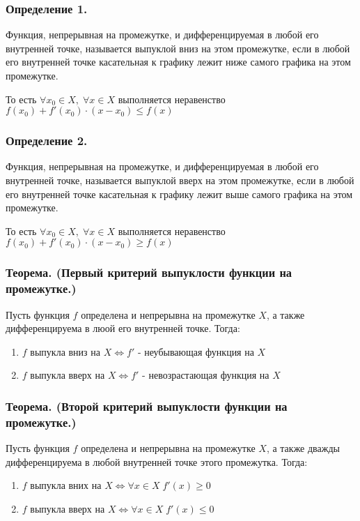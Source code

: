 \documentclass[a4paper,12pt]{article}
\theoremstyle{plain} %
\theoremstyle{definition} %
\theoremstyle{remark} %
\begin{document}
\subsubsection*{Определение 1.}
Функция, непрерывная на промежутке, и дифференцируемая в любой его внутренней точке, называется выпуклой вниз на этом промежутке, если в любой его внутренней точке касательная к графику лежит ниже самого графика на этом промежутке.

То есть $\forall x_0 \in X, \; \forall x \in X$ выполняется неравенство $f(x_0) + f'(x_0) \cdot (x - x_0) \leq f(x)$

\subsubsection*{Определение 2.}
Функция, непрерывная на промежутке, и дифференцируемая в любой его внутренней точке, называется выпуклой вверх на этом промежутке, если в любой его внутренней точке касательная к графику лежит выше самого графика на этом промежутке.

То есть $\forall x_0 \in X, \; \forall x \in X$ выполняется неравенство $f(x_0) + f'(x_0) \cdot (x - x_0) \geq f(x)$

\subsubsection*{Теорема. (Первый критерий выпуклости функции на промежутке.)}
Пусть функция $f$ определена и непрерывна на промежутке $X$, а также дифференцируема в люой его внутренней точке. Тогда:

\begin{enumerate}
	\item $f$ выпукла вниз на $X \Leftrightarrow f'$ - неубывающая функция на $X$
	\item $f$ выпукла вверх на $X \Leftrightarrow f'$ - невозрастающая функция на $X$
\end{enumerate}

\subsubsection*{Теорема. (Второй критерий выпуклости функции на промежутке.)}
Пусть функция $f$ определена и непрерывна на промежутке $X$, а также дважды дифференцируема в любой внутренней точке этого промежутка.
Тогда:

\begin{enumerate}
	\item $f$ выпукла вних на $X \Leftrightarrow \forall x \in X \;  f'(x) \geq 0$
	\item $f$ выпукла вверх на $X \Leftrightarrow \forall x \in X \; f'(x) \leq 0$
\end{enumerate}
\end{document}
